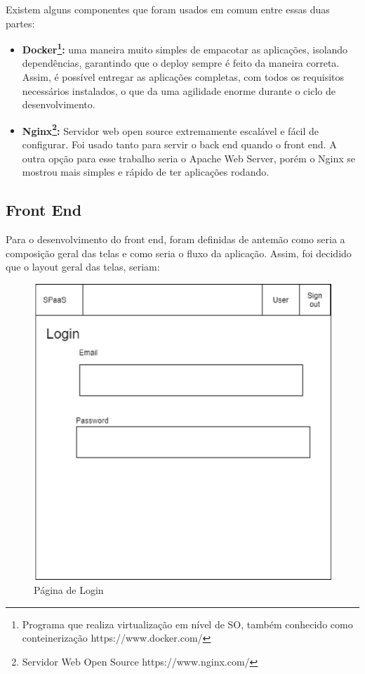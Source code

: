 \documentclass[11pt,twoside]{article}
\begin{document}
Existem alguns componentes que foram usados em comum entre essas duas partes:

\begin{itemize}
  \item \textbf{Docker\footnote{Programa que realiza virtualização em nível de SO, também conhecido como conteinerização https://www.docker.com/}:} 
  uma maneira muito simples de empacotar as aplicações, isolando dependências, garantindo que o deploy sempre é feito da maneira correta. Assim, é possível entregar as aplicações completas, com
  todos os requisitos necessários instalados, o que da uma agilidade enorme durante o ciclo de desenvolvimento.
  \item \textbf{Nginx\footnote{Servidor Web Open Source https://www.nginx.com/}:} Servidor web open source extremamente escalável e fácil de configurar. Foi usado tanto para servir o back end quando o front end. A outra opção para esse trabalho seria o Apache Web Server, porém
  o Nginx se mostrou mais simples e rápido de ter aplicações rodando.
\end{itemize}

\subsection{Front End}

Para o desenvolvimento do front end, foram definidas de antemão como seria a composição geral das telas e como seria o fluxo da aplicação. Assim, foi decidido que o layout geral das telas, seriam:

\begin{figure}[!h]
  \centering
  \includegraphics[scale=0.4]{login.eps}
  \caption{Página de Login}
  \label{fig:loginScreen}
\end{figure}
\end{document}
